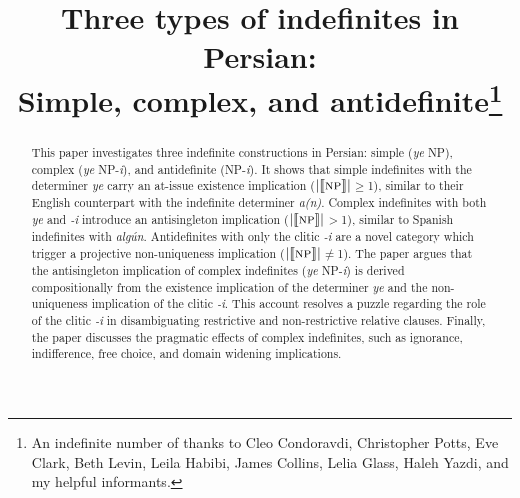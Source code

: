 \documentclass{salt}
\title[Three types of indefinites in Persian]{Three types of indefinites in Persian: \\Simple, complex, and antidefinite\thanks{An indefinite number of thanks to Cleo Condoravdi, Christopher Potts, Eve Clark, Beth Levin, Leila Habibi, James Collins, Lelia Glass, Haleh Yazdi, and my helpful informants.}}
\author[Jasbi]{%
  \saltauthor{Masoud Jasbi \\ \institute{Stanford University}}
}
\begin{document}

\maketitle

%
 \setcounter{page}{244}

%
%

\begin{abstract}  
This paper investigates three indefinite constructions in Persian: simple (\emph{ye} NP), complex (\emph{ye} NP-\emph{i}), and antidefinite (NP-\emph{i}). It shows that simple indefinites with the determiner \emph{ye} carry an at-issue existence implication ($| \llbracket \textsc{np} \rrbracket |$$\geq$1), similar to their English counterpart with the indefinite determiner \emph{a(n)}. Complex indefinites with both \emph{ye} and \emph{-i} introduce an antisingleton implication ($| \llbracket \textsc{np} \rrbracket |$$>$1), similar to Spanish indefinites with \emph{alg\'{u}n}. Antidefinites with only the clitic \emph{-i} are a novel category which trigger a projective non-uniqueness implication ($| \llbracket \textsc{np} \rrbracket |$$\not=$1). The paper argues that the antisingleton implication of complex indefinites (\emph{ye} NP-\emph{i}) is derived compositionally from the existence implication of the determiner \emph{ye} and the non-uniqueness implication of the clitic \emph{-i}. This account resolves a puzzle regarding the role of the clitic \emph{-i} in disambiguating restrictive and non-restrictive relative clauses. Finally, the paper discusses the pragmatic effects of complex indefinites, such as ignorance, indifference, free choice, and domain widening implications.

\end{abstract}
\end{document}
